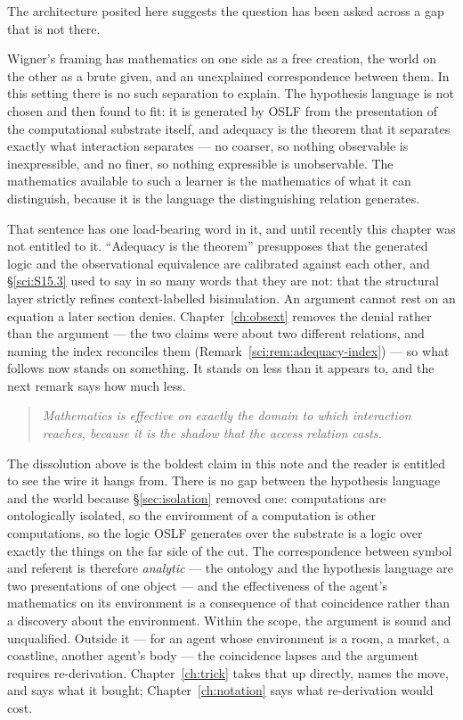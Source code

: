 The architecture posited here suggests the question has been asked across a gap that is not there.

Wigner's framing has mathematics on one side as a free creation, the world on the other as a brute
given, and an unexplained correspondence between them. In this setting there is no such separation to
explain. The hypothesis language is not chosen and then found to fit: it is generated by OSLF from the
presentation of the computational substrate itself, and adequacy is the theorem that it separates
exactly what interaction separates --- no coarser, so nothing observable is inexpressible, and no
finer, so nothing expressible is unobservable. The mathematics available to such a learner is the
mathematics of what it can distinguish, because it is the language the distinguishing relation
generates.

That sentence has one load-bearing word in it, and until recently this chapter was not entitled to it.
``Adequacy is the theorem'' presupposes that the generated logic and the observational equivalence are
calibrated against each other, and \S\ref{sci:S15.3} used to say in so many words that they are not:
that the structural layer strictly refines context-labelled bisimulation. An argument cannot rest on an
equation a later section denies. Chapter~\ref{ch:obsext} removes the denial rather than the argument
--- the two claims were about two different relations, and naming the index reconciles them
(Remark~\ref{sci:rem:adequacy-index}) --- so what follows now stands on something. It stands on less
than it appears to, and the next remark says how much less.

\begin{quote}
\itshape Mathematics is effective on exactly the domain to which interaction reaches, because it is
the shadow that the access relation casts.
\end{quote}

\begin{remark}
\label{sci:rem:wigner-scope}
The dissolution above is the boldest claim in this note and the reader is entitled to see the wire it hangs
from. There is no gap between the hypothesis language and the world because \S\ref{sec:isolation} removed
one: computations are ontologically isolated, so the environment of a computation is other computations,
so the logic OSLF generates over the substrate is a logic over exactly the things on the far side of the
cut. The correspondence between symbol and referent is therefore \emph{analytic} --- the ontology and the
hypothesis language are two presentations of one object --- and the effectiveness of the agent's
mathematics on its environment is a consequence of that coincidence rather than a discovery about the
environment. Within the scope, the argument is sound and unqualified. Outside it --- for an agent whose
environment is a room, a market, a coastline, another agent's body --- the coincidence lapses and the
argument requires re-derivation. Chapter~\ref{ch:trick} takes that up directly, names the move, and says
what it bought; Chapter~\ref{ch:notation} says what re-derivation would cost.
\end{remark}


